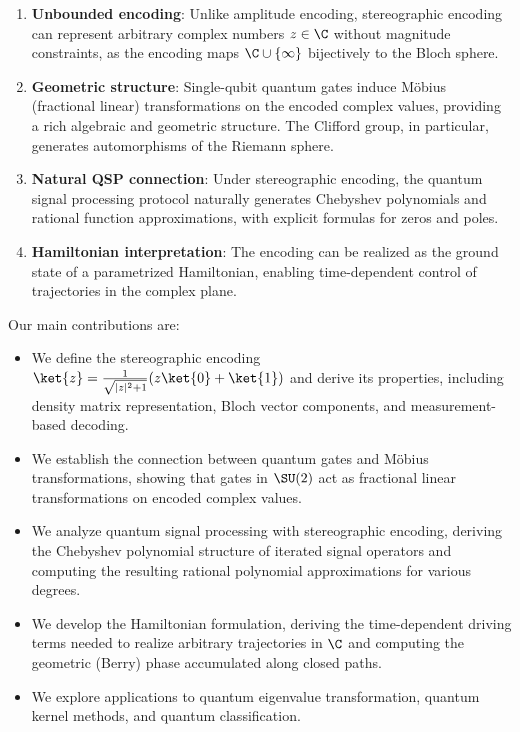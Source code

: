 \begin{enumerate}
    \item \textbf{Unbounded encoding}: Unlike amplitude encoding, stereographic encoding can represent arbitrary complex numbers $z \in \C$ without magnitude constraints, as the encoding maps $\C \cup \{\infty\}$ bijectively to the Bloch sphere.
    
    \item \textbf{Geometric structure}: Single-qubit quantum gates induce Möbius (fractional linear) transformations on the encoded complex values, providing a rich algebraic and geometric structure. The Clifford group, in particular, generates automorphisms of the Riemann sphere.
    
    \item \textbf{Natural QSP connection}: Under stereographic encoding, the quantum signal processing protocol naturally generates Chebyshev polynomials and rational function approximations, with explicit formulas for zeros and poles.
    
    \item \textbf{Hamiltonian interpretation}: The encoding can be realized as the ground state of a parametrized Hamiltonian, enabling time-dependent control of trajectories in the complex plane.
\end{enumerate}

Our main contributions are:

\begin{itemize}
    \item We define the stereographic encoding $\ket{z} = \frac{1}{\sqrt{|z|^2+1}}(z\ket{0} + \ket{1})$ and derive its properties, including density matrix representation, Bloch vector components, and measurement-based decoding.
    
    \item We establish the connection between quantum gates and Möbius transformations, showing that gates in $\SU(2)$ act as fractional linear transformations on encoded complex values.
    
    \item We analyze quantum signal processing with stereographic encoding, deriving the Chebyshev polynomial structure of iterated signal operators and computing the resulting rational polynomial approximations for various degrees.
    
    \item We develop the Hamiltonian formulation, deriving the time-dependent driving terms needed to realize arbitrary trajectories in $\C$ and computing the geometric (Berry) phase accumulated along closed paths.
    
    \item We explore applications to quantum eigenvalue transformation, quantum kernel methods, and quantum classification.
\end{itemize}

